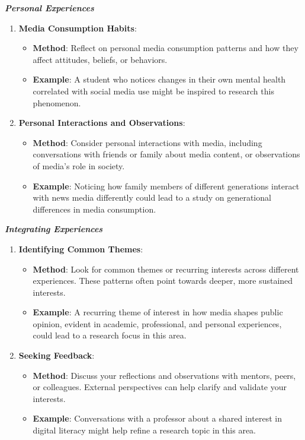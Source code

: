 \documentclass[
]{book}
\providecommand{\tightlist}{%
  \setlength{\itemsep}{0pt}\setlength{\parskip}{0pt}}
\begin{document}
\textbf{\emph{Personal Experiences}}

\begin{enumerate}
\def\labelenumi{\arabic{enumi}.}
\tightlist
\item
  \textbf{Media Consumption Habits}:

  \begin{itemize}
  \tightlist
  \item
    \textbf{Method}: Reflect on personal media consumption patterns and how they affect attitudes, beliefs, or behaviors.
  \item
    \textbf{Example}: A student who notices changes in their own mental health correlated with social media use might be inspired to research this phenomenon.
  \end{itemize}
\item
  \textbf{Personal Interactions and Observations}:

  \begin{itemize}
  \tightlist
  \item
    \textbf{Method}: Consider personal interactions with media, including conversations with friends or family about media content, or observations of media's role in society.
  \item
    \textbf{Example}: Noticing how family members of different generations interact with news media differently could lead to a study on generational differences in media consumption.
  \end{itemize}
\end{enumerate}

\textbf{\emph{Integrating Experiences}}

\begin{enumerate}
\def\labelenumi{\arabic{enumi}.}
\tightlist
\item
  \textbf{Identifying Common Themes}:

  \begin{itemize}
  \tightlist
  \item
    \textbf{Method}: Look for common themes or recurring interests across different experiences. These patterns often point towards deeper, more sustained interests.
  \item
    \textbf{Example}: A recurring theme of interest in how media shapes public opinion, evident in academic, professional, and personal experiences, could lead to a research focus in this area.
  \end{itemize}
\item
  \textbf{Seeking Feedback}:

  \begin{itemize}
  \tightlist
  \item
    \textbf{Method}: Discuss your reflections and observations with mentors, peers, or colleagues. External perspectives can help clarify and validate your interests.
  \item
    \textbf{Example}: Conversations with a professor about a shared interest in digital literacy might help refine a research topic in this area.
  \end{itemize}
\end{enumerate}
\end{document}
